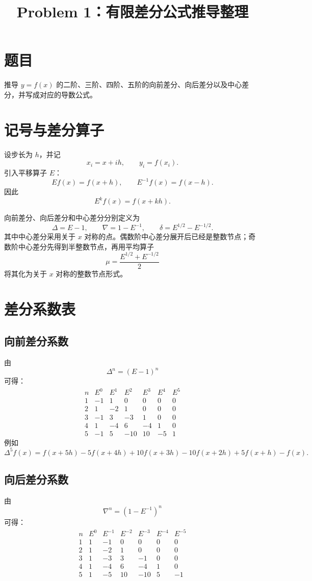 \documentclass[12pt,a4paper]{ctexart}
\title{Problem 1：有限差分公式推导整理}
\author{}
\date{}
\begin{document}
\maketitle

\section*{题目}
推导 $y=f(x)$ 的二阶、三阶、四阶、五阶的向前差分、向后差分以及中心差分，并写成对应的导数公式。

\section{记号与差分算子}
设步长为 $h$，并记
\[
  x_i=x+ih,\qquad y_i=f(x_i).
\]
引入平移算子 $E$：
\[
  E f(x)=f(x+h),\qquad E^{-1}f(x)=f(x-h).
\]
因此
\[
  E^k f(x)=f(x+kh).
\]

向前差分、向后差分和中心差分分别定义为
\[
  \Delta=E-1,\qquad \nabla=1-E^{-1},\qquad \delta=E^{1/2}-E^{-1/2}.
\]
其中中心差分采用关于 $x$ 对称的点。偶数阶中心差分展开后已经是整数节点；奇数阶中心差分先得到半整数节点，再用平均算子
\[
  \mu=\frac{E^{1/2}+E^{-1/2}}{2}
\]
将其化为关于 $x$ 对称的整数节点形式。

\section{差分系数表}
\subsection{向前差分系数}
由
\[
  \Delta^n=(E-1)^n
\]
可得：
\[
\begin{array}{c|rrrrrr}
 n & E^0&E^1&E^2&E^3&E^4&E^5\\
\hline
1&-1&1&0&0&0&0\\
2&1&-2&1&0&0&0\\
3&-1&3&-3&1&0&0\\
4&1&-4&6&-4&1&0\\
5&-1&5&-10&10&-5&1
\end{array}
\]
例如
\[
  \Delta^5 f(x)=f(x+5h)-5f(x+4h)+10f(x+3h)-10f(x+2h)+5f(x+h)-f(x).
\]

\subsection{向后差分系数}
由
\[
  \nabla^n=(1-E^{-1})^n
\]
可得：
\[
\begin{array}{c|rrrrrr}
 n & E^0&E^{-1}&E^{-2}&E^{-3}&E^{-4}&E^{-5}\\
\hline
1&1&-1&0&0&0&0\\
2&1&-2&1&0&0&0\\
3&1&-3&3&-1&0&0\\
4&1&-4&6&-4&1&0\\
5&1&-5&10&-10&5&-1
\end{array}
\]
\end{document}
